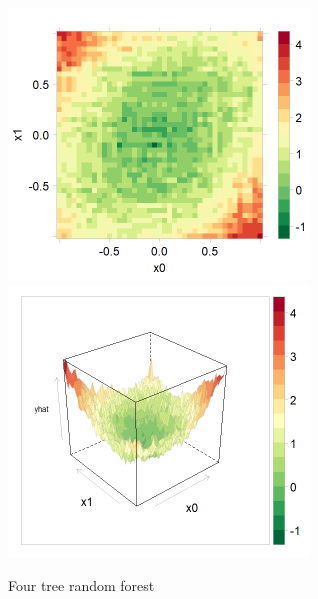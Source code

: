 \documentclass[10pt,openany]{article}
\numberwithin{definition}{section}
\numberwithin{example}{section}
\numberwithin{equation}{section}
\numberwithin{figure}{section}
\begin{document}
\begin{figure}
\noindent \begin{centering}
\includegraphics[width=80mm]{../fig/rf-4-tree-levelplot}~
\includegraphics[width=80mm]{../fig/rf-4-tree-wireframe}
\par\end{centering}
\protect\caption{\label{fig:four-tree-random}Four tree random forest}
\end{figure}
\end{document}
